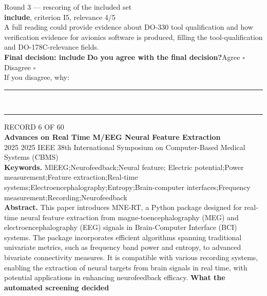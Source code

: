\documentclass[11pt,a4paper]{article}
\begin{document}
{\footnotesize\color{soft}Round 3 --- rescoring of the included set}\\[0.5mm]
{\small\textbf{include}, criterion I5, relevance 4/5}\\[0.5mm]
{\small A full reading could provide evidence about DO-330 tool qualification and how verification evidence for avionics software is produced, filling the tool-qualification and DO-178C-relevance fields.}\\[2.5mm]
{\small\textbf{Final decision: include}}
\vspace{2mm}
{\small\textbf{Do you agree with the final decision?}\quad{}Agree $\square$\qquad{}Disagree $\square$}\\[1mm]
{\footnotesize\color{soft}If you disagree, why:}\\[1mm]
\color{rule}\rule{\linewidth}{0.3pt}\\[3mm]\rule{\linewidth}{0.3pt}\color{black}
\clearpage
{\color{soft}\footnotesize RECORD 6 OF 60}\\[1mm]
{\large\bfseries Advances on Real Time M/EEG Neural Feature Extraction}\\[1.5mm]
{\color{soft}\small 2025 \textperiodcentered{} 2025 IEEE 38th International Symposium on Computer-Based Medical Systems (CBMS)}\\[2mm]
{\small\textbf{Keywords.} MlEEG;Neurofeedback;Neural feature; Electric potential;Power measurement;Feature extraction;Real-time systems;Electroencephalography;Entropy;Brain-computer interfaces;Frequency measurement;Recording;Neurofeedback}\\[2mm]
{\small\textbf{Abstract.} This paper introduces MNE-RT, a Python package designed for real-time neural feature extraction from magne-toencephalography (MEG) and electroencephalography (EEG) signals in Brain-Computer Interface (BCI) systems. The package incorporates efficient algorithms spanning traditional univariate metrics, such as frequency band power and entropy, to advanced bivariate connectivity measures. It is compatible with various recording systems, enabling the extraction of neural targets from brain signals in real time, with potential applications in enhancing neurofeedback efficacy.}
\vspace{3mm}
\vspace{2.5mm}
{\small\textbf{What the automated screening decided}}\\[2mm]
\end{document}
